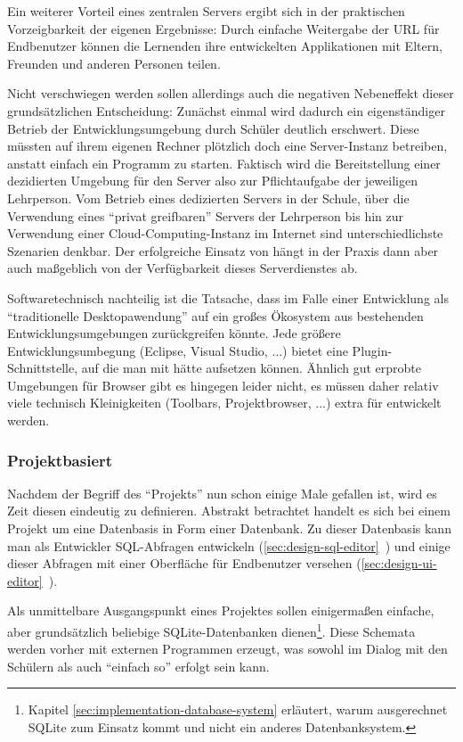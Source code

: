 Ein weiterer Vorteil eines zentralen Servers ergibt sich in der praktischen Vorzeigbarkeit der eigenen Ergebnisse: Durch einfache Weitergabe der URL für Endbenutzer können die Lernenden ihre entwickelten Applikationen mit Eltern, Freunden und anderen Personen teilen.

Nicht verschwiegen werden sollen allerdings auch die negativen Nebeneffekt dieser grundsätzlichen Entscheidung: Zunächst einmal wird dadurch ein eigenständiger Betrieb der Entwicklungsumgebung durch Schüler deutlich erschwert. Diese müssten auf ihrem eigenen Rechner plötzlich doch eine Server-Instanz betreiben, anstatt einfach ein Programm zu starten. Faktisch wird die Bereitstellung einer dezidierten Umgebung für den Server also zur Pflichtaufgabe der jeweiligen Lehrperson. Vom Betrieb eines dedizierten Servers in der Schule, über die Verwendung eines ``privat greifbaren'' Servers der Lehrperson bis hin zur Verwendung einer Cloud-Computing-Instanz im Internet sind unterschiedlichste Szenarien denkbar. Der erfolgreiche Einsatz von \idename{} hängt in der Praxis dann aber auch maßgeblich von der Verfügbarkeit dieses Serverdienstes ab.

Softwaretechnisch nachteilig ist die Tatsache, dass \idename{} im Falle einer Entwicklung als ``traditionelle Desktopawendung'' auf ein großes Ökosystem aus bestehenden Entwicklungsumgebungen zurückgreifen könnte. Jede größere Entwicklungsumbegung (Eclipse, Visual Studio, ...) bietet eine Plugin-Schnittstelle, auf die man mit \idename{} hätte aufsetzen können. Ähnlich gut erprobte Umgebungen für Browser gibt es hingegen leider nicht, es müssen daher relativ viele technisch Kleinigkeiten (Toolbars, Projektbrowser, ...) extra für \idename{} entwickelt werden.

\subsubsection{Projektbasiert}

Nachdem der Begriff des ``Projekts'' nun schon einige Male gefallen ist, wird es Zeit diesen eindeutig zu definieren. Abstrakt betrachtet handelt es sich bei einem Projekt um eine Datenbasis in Form einer Datenbank. Zu dieser Datenbasis kann man als Entwickler SQL-Abfragen entwickeln (\ref{sec:design-sql-editor}~) und einige dieser Abfragen mit einer Oberfläche für Endbenutzer versehen (\ref{sec:design-ui-editor}~).

Als unmittelbare Ausgangspunkt eines Projektes sollen einigermaßen einfache, aber grundsätzlich beliebige SQLite-Datenbanken dienen\footnote{Kapitel \ref{sec:implementation-database-system}  erläutert, warum ausgerechnet SQLite zum Einsatz kommt und nicht ein anderes Datenbanksystem.}. Diese Schemata werden vorher mit externen Programmen erzeugt, was sowohl im Dialog mit den Schülern als auch ``einfach so'' erfolgt sein kann.


